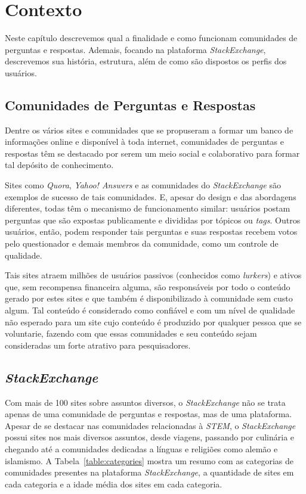 \chapter{Contexto}
\label{ch:contexto}

Neste capítulo descrevemos qual a finalidade e como funcionam comunidades de perguntas e respostas. Ademais, focando na plataforma \emph{StackExchange}, descrevemos sua história, estrutura, além de como são dispostos os perfis dos usuários.

\section{Comunidades de Perguntas e Respostas} %
\label{sec:comunidades_de_perguntas_e_respostas}
Dentre os vários sites e comunidades que se propuseram a formar um banco de informações online e disponível à toda internet, comunidades de perguntas e respostas têm se destacado por serem um meio social e colaborativo para formar tal depósito de conhecimento.

Sites como \emph{Quora}, \emph{Yahoo! Answers} e as comunidades do \emph{StackExchange} são exemplos de sucesso de tais comunidades. E, apesar do design e das abordagens diferentes, todas têm o mecanismo de funcionamento similar: usuários postam perguntas que são expostas publicamente e divididas por tópicos ou \emph{tags}. Outros usuários, então, podem responder tais perguntas e suas respostas recebem votos pelo questionador e demais membros da comunidade, como um controle de qualidade.

Tais sites atraem milhões de usuários passivos (conhecidos como \emph{lurkers}) e ativos que, sem recompensa financeira alguma, são responsáveis por todo o conteúdo gerado por estes sites e que também é disponibilizado à comunidade sem custo algum. Tal conteúdo é considerado como confiável e com um nível de qualidade não esperado para um site cujo conteúdo é produzido por qualquer pessoa que se voluntarie, fazendo com que essas comunidades e seu conteúdo sejam consideradas um forte atrativo para pesquisadores.


\section{\emph{StackExchange}}

Com mais de 100 sites sobre assuntos diversos, o \emph{StackExchange} não se trata apenas de uma comunidade de perguntas e respostas, mas de uma plataforma. Apesar de se destacar nas comunidades relacionadas à \emph{STEM}, o \emph{StackExchange} possui sites nos mais diversos assuntos, desde viagens, passando por culinária e chegando até a comunidades dedicadas a línguas e religiões como alemão e islamismo. A Tabela~\ref{table:categories} mostra um resumo com as categorias de comunidades presentes na plataforma \emph{StackExchange}, a quantidade de sites em cada categoria e a idade média dos sites em cada categoria.

